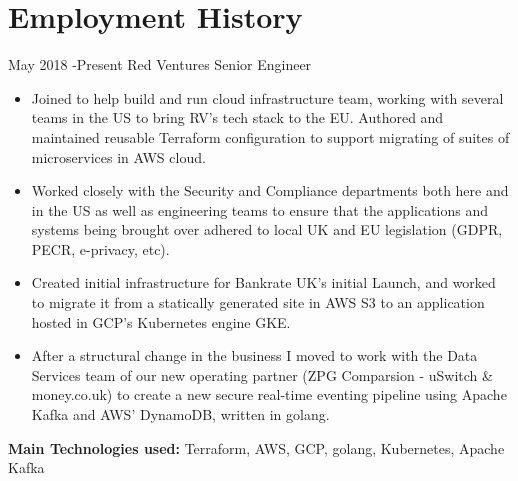 \documentclass[10pt]{article} %
\begin{document}
\section{Employment History}

\jobheader
{May 2018 -}{Present}
{Red Ventures}
{Senior Engineer}
\vspace{-1cm}
  \begin{itemize}

  \item Joined to help build and run cloud infrastructure team, working
        with several teams in the US to bring RV's tech stack to the EU. Authored
        and maintained reusable Terraform configuration to support migrating of
        suites of microservices in AWS cloud.

  \item Worked closely with the Security and Compliance departments both here and
        in the US as well as engineering teams to ensure that the applications and
        systems being brought over adhered to local UK and EU legislation
        (GDPR, PECR, e-privacy, etc).

  \item Created initial infrastructure for Bankrate UK's initial Launch, and worked
        to migrate it from a statically generated site in AWS S3 to an application hosted
        in GCP's Kubernetes engine GKE.

  \item After a structural change in the business I moved to work with the Data
        Services team of our new operating partner
        (ZPG Comparsion - uSwitch \& money.co.uk)
        to create a new secure real-time eventing pipeline using Apache Kafka
        and AWS' DynamoDB, written in golang.

  \end{itemize}

  \textbf{Main Technologies used:}
  Terraform, AWS, GCP, golang, Kubernetes, Apache Kafka
\end{document}
